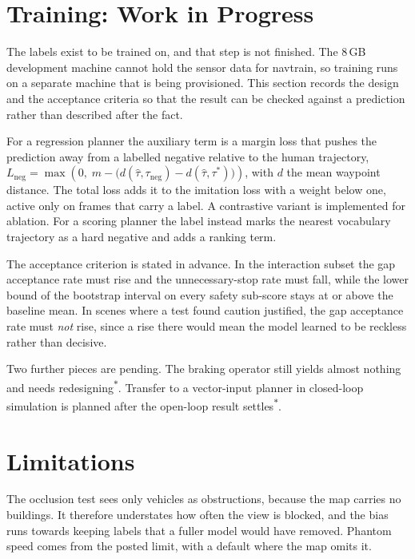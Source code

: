 \documentclass[conference]{IEEEtran}
\newcommand{\wip}{\textsuperscript{\textcolor{orange!80!black}{$\ast$}}}
\begin{document}
\section{Training: Work in Progress}
\label{sec:wip}

The labels exist to be trained on, and that step is not finished. The 8\,GB
development machine cannot hold the sensor data for navtrain, so training runs
on a separate machine that is being provisioned. This section records the design
and the acceptance criteria so that the result can be checked against a
prediction rather than described after the fact.

For a regression planner the auxiliary term is a margin loss that pushes the
prediction away from a labelled negative relative to the human trajectory,
$L_\text{neg} = \max\!\left(0,\; m - \bigl(d(\hat\tau,\tau_\text{neg}) -
d(\hat\tau,\tau^{*})\bigr)\right)$, with $d$ the mean waypoint distance. The
total loss adds it to the imitation loss with a weight below one, active only on
frames that carry a label. A contrastive variant is implemented for ablation.
For a scoring planner the label instead marks the nearest vocabulary trajectory
as a hard negative and adds a ranking term.

The acceptance criterion is stated in advance. In the interaction subset the gap
acceptance rate must rise and the unnecessary-stop rate must fall, while the
lower bound of the bootstrap interval on every safety sub-score stays at or
above the baseline mean. In scenes where a test found caution justified, the gap
acceptance rate must \emph{not} rise, since a rise there would mean the model
learned to be reckless rather than decisive.

Two further pieces are pending. The braking operator still yields almost nothing
and needs redesigning\wip. Transfer to a vector-input planner in closed-loop
simulation is planned after the open-loop result settles\wip.

\section{Limitations}

The occlusion test sees only vehicles as obstructions, because the map carries
no buildings. It therefore understates how often the view is blocked, and the
bias runs towards keeping labels that a fuller model would have removed.
Phantom speed comes from the posted limit, with a default where the map omits
it.
\end{document}
